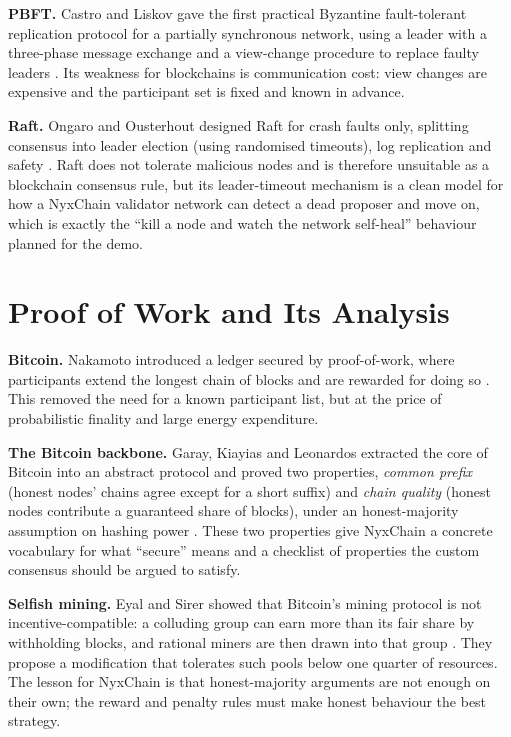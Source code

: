 \documentclass[11pt,a4paper]{article}
\begin{document}
\textbf{PBFT.} Castro and Liskov gave the first practical Byzantine fault-tolerant replication protocol for a partially synchronous network, using a leader with a three-phase message exchange and a view-change procedure to replace faulty leaders \cite{castro1999}. Its weakness for blockchains is communication cost: view changes are expensive and the participant set is fixed and known in advance.

\textbf{Raft.} Ongaro and Ousterhout designed Raft for crash faults only, splitting consensus into leader election (using randomised timeouts), log replication and safety \cite{ongaro2014}. Raft does not tolerate malicious nodes and is therefore unsuitable as a blockchain consensus rule, but its leader-timeout mechanism is a clean model for how a NyxChain validator network can detect a dead proposer and move on, which is exactly the ``kill a node and watch the network self-heal'' behaviour planned for the demo.

\section{Proof of Work and Its Analysis}\label{sec:pow}

\textbf{Bitcoin.} Nakamoto introduced a ledger secured by proof-of-work, where participants extend the longest chain of blocks and are rewarded for doing so \cite{nakamoto2008}. This removed the need for a known participant list, but at the price of probabilistic finality and large energy expenditure.

\textbf{The Bitcoin backbone.} Garay, Kiayias and Leonardos extracted the core of Bitcoin into an abstract protocol and proved two properties, \emph{common prefix} (honest nodes' chains agree except for a short suffix) and \emph{chain quality} (honest nodes contribute a guaranteed share of blocks), under an honest-majority assumption on hashing power \cite{garay2015}. These two properties give NyxChain a concrete vocabulary for what ``secure'' means and a checklist of properties the custom consensus should be argued to satisfy.

\textbf{Selfish mining.} Eyal and Sirer showed that Bitcoin's mining protocol is not incentive-compatible: a colluding group can earn more than its fair share by withholding blocks, and rational miners are then drawn into that group \cite{eyal2014}. They propose a modification that tolerates such pools below one quarter of resources. The lesson for NyxChain is that honest-majority arguments are not enough on their own; the reward and penalty rules must make honest behaviour the best strategy.
\end{document}
